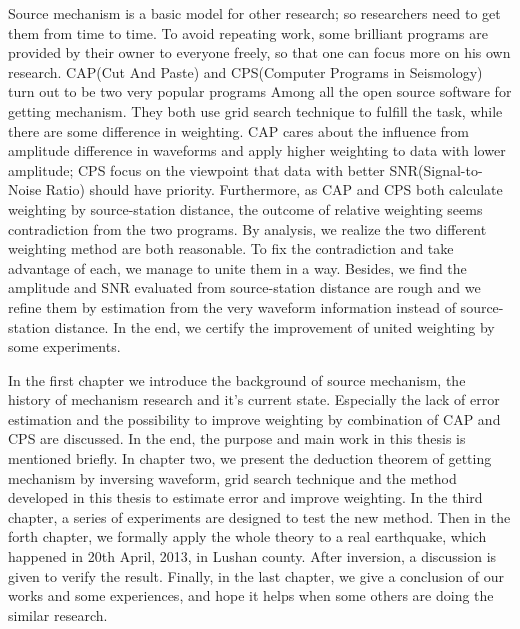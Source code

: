 \begin{enabstract}
Source mechanism is a basic model for other research; so researchers need to get them from time to time. To avoid repeating work, some brilliant programs are provided by their owner to everyone freely, so that one can focus more on his own research. CAP(Cut And Paste) and CPS(Computer Programs in Seismology) turn out to be two very popular programs Among all the open source software for getting mechanism. They both use grid search technique to fulfill the task, while there are some difference in weighting. CAP cares about the influence from amplitude difference in waveforms and apply higher weighting to data with lower amplitude; CPS focus on the viewpoint that data with better SNR(Signal-to-Noise Ratio) should have priority. Furthermore, as CAP and CPS both calculate weighting by source-station distance, the outcome of relative weighting seems contradiction from the two programs. By analysis, we realize the two different weighting method are both reasonable. To fix the contradiction and take advantage of each, we manage to unite them in a way. Besides, we find the amplitude and SNR evaluated from source-station distance are rough and we refine them by estimation from the very waveform information instead of source-station distance. In the end, we certify the improvement of united weighting by some experiments.

In the first chapter we introduce the background of source mechanism, the history of mechanism research and it's current state. Especially the lack of error estimation and the possibility to improve weighting by combination of CAP and CPS are discussed. In the end, the purpose and main work in this thesis is mentioned briefly. In chapter two, we present the deduction theorem of getting mechanism by inversing waveform, grid search technique and the method developed in this thesis to estimate error and improve weighting. In the third chapter, a series of experiments are designed to test the new method. Then in the forth chapter, we formally apply the whole theory to a real earthquake, which happened in 20th April, 2013, in Lushan county. After inversion, a discussion is given to verify the result. Finally, in the last chapter, we give a conclusion of our works and some experiences, and hope it helps when some others are doing the similar research.

\end{enabstract}
\vspace{1em}\par\vfill

